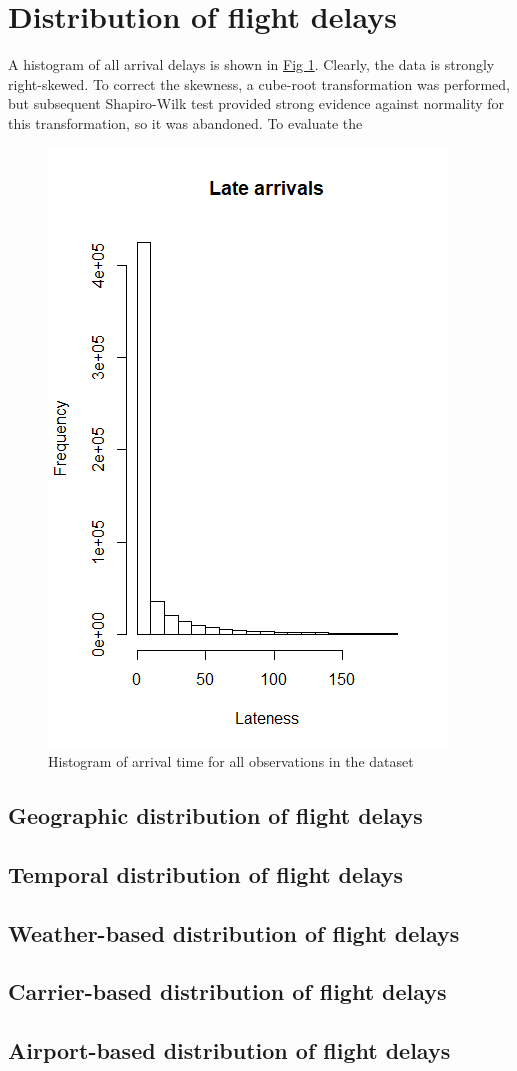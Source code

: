 \documentclass[12pt, a4paper]{book}
\newcommand\tab[1][1cm]{\hspace*{#1}}
\begin{document}
	\section{Distribution of flight delays}
	\tab A histogram of all arrival delays is shown in \underline{Fig 1}. Clearly, the data is strongly right-skewed. To correct the skewness, a cube-root transformation was performed, but subsequent Shapiro-Wilk test provided strong evidence against normality for this transformation, so it was abandoned. To evaluate the \\
	\begin{figure}
	\centering
	 \includegraphics[width = .45 \textwidth]{../figures/LateArrivalsHistogram}
	 \caption{Histogram of arrival time for all observations in the dataset}
	 \end{figure}
		\subsection{Geographic distribution of flight delays}
		\subsection{Temporal distribution of flight delays}
		\subsection{Weather-based distribution of flight delays}
		\subsection{Carrier-based distribution of flight delays}
		\subsection{Airport-based distribution of flight delays}
\end{document}
